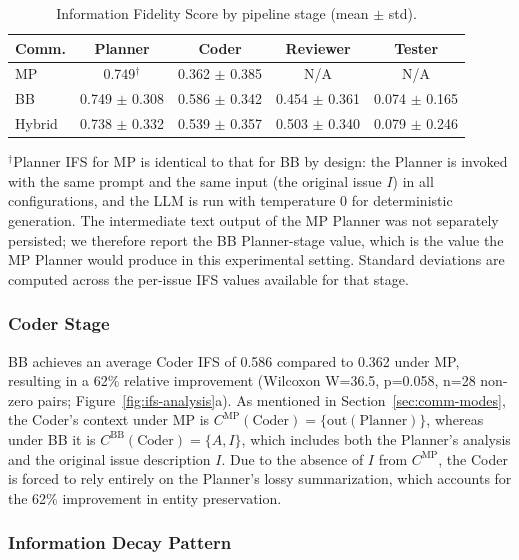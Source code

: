 \documentclass{ieeeaccess}
\begin{document}
\begin{table}[!ht]
\centering
\caption{Information Fidelity Score by pipeline stage (mean $\pm$ std).}
\label{tab:ifs}
\begin{tabular}{lcccc}
\toprule
\textbf{Comm.} & \textbf{Planner} & \textbf{Coder} & \textbf{Reviewer} & \textbf{Tester} \\
\midrule
MP & 0.749$^{\dagger}$ & 0.362 $\pm$ 0.385 & N/A & N/A \\
BB & 0.749 $\pm$ 0.308 & 0.586 $\pm$ 0.342 & 0.454 $\pm$ 0.361 & 0.074 $\pm$ 0.165 \\
Hybrid & 0.738 $\pm$ 0.332 & 0.539 $\pm$ 0.357 & 0.503 $\pm$ 0.340 & 0.079 $\pm$ 0.246 \\
\bottomrule
\end{tabular}

\vspace{1mm}
\footnotesize
$^{\dagger}$Planner IFS for MP is identical to that for BB by design: the Planner is invoked with the same prompt and the same input (the original issue $I$) in all configurations, and the LLM is run with temperature 0 for deterministic generation. The intermediate text output of the MP Planner was not separately persisted; we therefore report the BB Planner-stage value, which is the value the MP Planner would produce in this experimental setting. Standard deviations are computed across the per-issue IFS values available for that stage.
\end{table}

\subsubsection{Coder Stage}

BB achieves an average Coder IFS of 0.586 compared to 0.362 under MP, resulting in a 62\% relative improvement (Wilcoxon W=36.5, p=0.058, n=28 non-zero pairs; Figure~\ref{fig:ifs-analysis}a). As mentioned in Section~\ref{sec:comm-modes}, the Coder's context under MP is $C^{\text{MP}}(\text{Coder}) = \{\text{out}(\text{Planner})\}$, whereas under BB it is $C^{\text{BB}}(\text{Coder}) = \{A, I\}$, which includes both the Planner's analysis and the original issue description $I$. Due to the absence of $I$ from $C^{\text{MP}}$, the Coder is forced to rely entirely on the Planner's lossy summarization, which accounts for the 62\% improvement in entity preservation.

\subsubsection{Information Decay Pattern}
\end{document}
